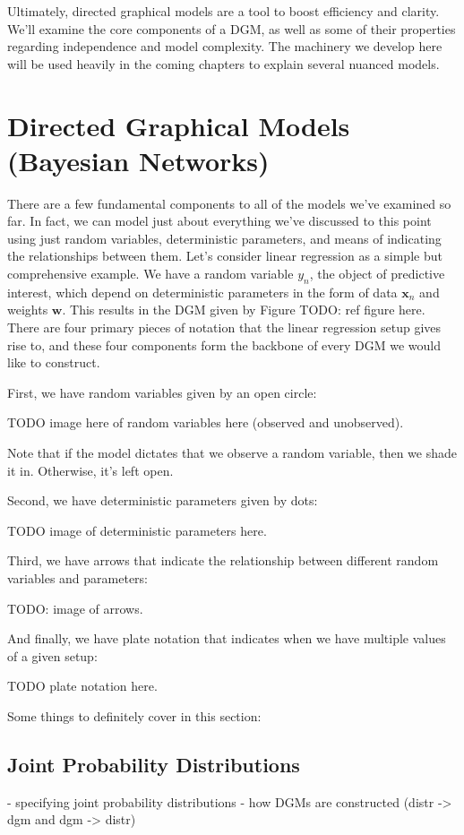 Ultimately, directed graphical models are a tool to boost efficiency and clarity. We'll examine the core components of a DGM, as well as some of their properties regarding independence and model complexity. The machinery we develop here will be used heavily in the coming chapters to explain several nuanced models.

\section{Directed Graphical Models (Bayesian Networks)}
There are a few fundamental components to all of the models we've examined so far. In fact, we can model just about everything we've discussed to this point using just random variables, deterministic parameters, and means of indicating the relationships between them. Let's consider linear regression as a simple but comprehensive example. We have a random variable $y_n$, the object of predictive interest, which depend on deterministic parameters in the form of data $\textbf{x}_n$ and weights $\textbf{w}$. This results in the DGM given by Figure TODO: ref figure here. There are four primary pieces of notation that the linear regression setup gives rise to, and these four components form the backbone of every DGM we would like to construct.

First, we have random variables given by an open circle:

TODO image here of random variables here (observed and unobserved).

Note that if the model dictates that we observe a random variable, then we shade it in. Otherwise, it's left open.

Second, we have deterministic parameters given by dots:

TODO image of deterministic parameters here.

Third, we have arrows that indicate the relationship between different random variables and parameters:

TODO: image of arrows.

And finally, we have plate notation that indicates when we have multiple values of a given setup:

TODO plate notation here.

Some things to definitely cover in this section:

\subsection{Joint Probability Distributions}
- specifying joint probability distributions
- how DGMs are constructed (distr -> dgm and dgm -> distr)

